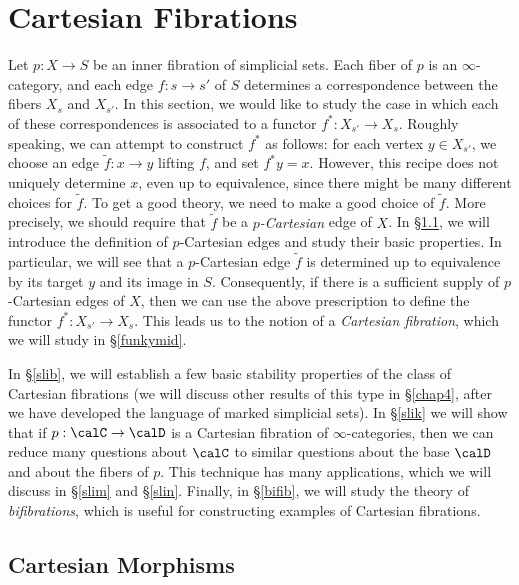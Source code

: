 \section{Cartesian Fibrations}\label{cartfibsec}

\setcounter{theorem}{0}

Let $p: X \rightarrow S$ be an inner fibration of simplicial sets. Each fiber of $p$ is an $\infty$-category, and each edge $f: s \rightarrow s'$ of $S$ determines a correspondence between
the fibers $X_{s}$ and $X_{s'}$.
In this section, we would like to study the case in which each of these correspondences is associated to a functor $f^{\ast}: X_{s'} \rightarrow X_{s}$. 
Roughly speaking, we can attempt to construct $f^{\ast}$ as follows: for each vertex $y \in X_{s'}$, we choose an edge $\widetilde{f}: x \rightarrow y$ lifting $f$, and set $f^{\ast} y = x$. However, this recipe does not uniquely determine $x$, even up to equivalence, since there might be many different choices for $\widetilde{f}$. To get a good theory, we need to make a good choice of $\widetilde{f}$. More precisely, we should require that
$\widetilde{f}$ be a {\it $p$-Cartesian} edge of $X$. In \S \ref{universalmorphisms}, we will introduce the definition of $p$-Cartesian edges and study their basic properties. In particular, we will see that a $p$-Cartesian edge $\widetilde{f}$ is determined up to equivalence by its target $y$ and its image in $S$. Consequently, if there is a sufficient supply of $p$-Cartesian edges of $X$, then we can use the above prescription to define the functor $f^{\ast}: X_{s'} \rightarrow X_{s}$.
This leads us to the notion of a {\it Cartesian fibration}, which we will study in \S \ref{funkymid}. 

In \S \ref{slib}, we will establish a few basic stability properties of the class of Cartesian fibrations (we will discuss other results of this type in \S \ref{chap4}, after we have developed the language of marked simplicial sets). In \S \ref{slik} we will show that if $p: \calC \rightarrow \calD$ is a Cartesian fibration of $\infty$-categories, then we can reduce many questions about $\calC$ to similar questions about the base $\calD$ and about the fibers of $p$. This technique has many applications, which we will discuss in \S \ref{slim} and \S \ref{slin}. Finally, in \S \ref{bifib}, we will study the theory of {\it bifibrations}, which is useful for constructing examples of Cartesian fibrations.

\subsection{Cartesian Morphisms}\label{universalmorphisms}

